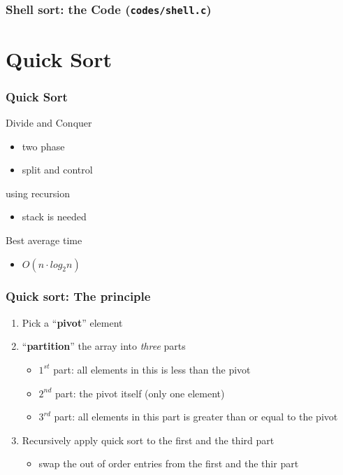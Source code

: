\documentclass[newPxFont,sthlmFooter,nooffset]{beamer}
\begin{document}
\begin{frame}[t, fragile]
  \frametitle{Shell sort: the Code (\texttt{codes/shell.c})}
  


\end{frame}


\section{Quick Sort}



\begin{frame}[t, fragile]
  \frametitle{Quick Sort}
Divide and Conquer
\begin{itemize}
\item two phase
\item split and control
\end{itemize}

using recursion
\begin{itemize}
\item stack is needed
\end{itemize}

Best average time
\begin{itemize}
\item $O(n\cdot log_2n)$
\end{itemize}
\end{frame}


\begin{frame}[t, fragile]
  \frametitle{Quick sort: The principle}
  \begin{enumerate}
  \item Pick a ``\textbf{pivot}'' element
  \item ``\textbf{partition}'' the array into \textit{three} parts
    \begin{itemize}
    \item $1^{st}$ part: all elements in this is less than the pivot
    \item $2^{nd}$ part: the pivot itself (only one element)
    \item $3^{rd}$ part: all elements in this part is greater than or equal to the pivot
    \end{itemize}
  \item Recursively apply quick sort to the first and the third part
    \begin{itemize}
    \item swap the out of order entries from the first and the thir part
    \end{itemize}
  \end{enumerate}


\end{frame}
\end{document}
